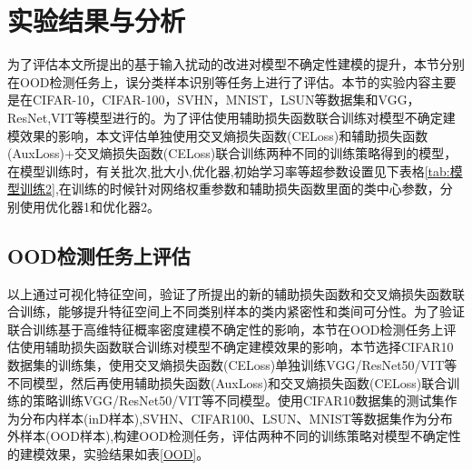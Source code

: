 \section{实验结果与分析}
为了评估本文所提出的基于输入扰动的改进对模型不确定性建模的提升，本节分别在OOD检测任务上，误分类样本识别等任务上进行了评估。本节的实验内容主要是在CIFAR-10，CIFAR-100，SVHN，MNIST，LSUN等数据集和VGG，ResNet,VIT等模型进行的。为了评估使用辅助损失函数联合训练对模型不确定建模效果的影响，本文评估单独使用交叉熵损失函数(CELoss)和辅助损失函数(AuxLoss)+交叉熵损失函数(CELoss)联合训练两种不同的训练策略得到的模型，在模型训练时，有关批次,批大小,优化器,初始学习率等超参数设置见下表格\ref{tab:模型训练2},在训练的时候针对网络权重参数和辅助损失函数里面的类中心参数，分别使用优化器1和优化器2。
\begin{table}[htbp]
	\captionsetup{font=small, justification=centering}
	\centering
	\caption{
	模型训练超参数设置
	}
        \label{tab:模型训练2}
\end{table}


\subsection{OOD检测任务上评估}

以上通过可视化特征空间，验证了所提出的新的辅助损失函数和交叉熵损失函数联合训练，能够提升特征空间上不同类别样本的类内紧密性和类间可分性。为了验证联合训练基于高维特征概率密度建模不确定性的影响，本节在OOD检测任务上评估使用辅助损失函数联合训练对模型不确定建模效果的影响，本节选择CIFAR10数据集的训练集，使用交叉熵损失函数(CELoss)单独训练VGG/ResNet50/VIT等不同模型，然后再使用辅助损失函数(AuxLoss)和交叉熵损失函数(CELoss)联合训练的策略训练VGG/ResNet50/VIT等不同模型。使用CIFAR10数据集的测试集作为分布内样本(inD样本),SVHN、CIFAR100、LSUN、MNIST等数据集作为分布外样本(OOD样本),构建OOD检测任务，评估两种不同的训练策略对模型不确定性的建模效果，实验结果如表\ref{OOD}。


